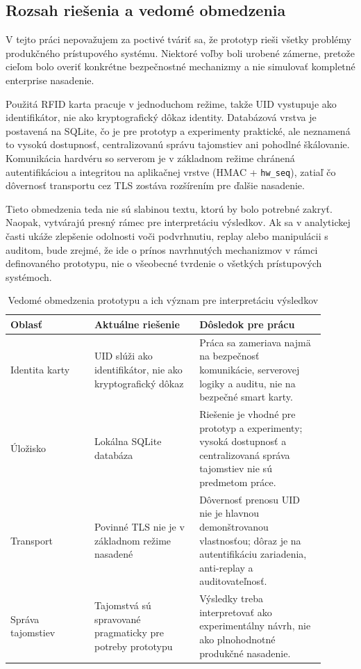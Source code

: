 \documentclass[journal,a4paper,onecolumn]{IEEEtran}
\begin{document}
\subsection{Rozsah riešenia a vedomé obmedzenia}

V tejto práci nepovažujem za poctivé tváriť sa, že prototyp rieši všetky problémy produkčného prístupového systému. Niektoré voľby boli urobené zámerne, pretože cieľom bolo overiť konkrétne bezpečnostné mechanizmy a nie simulovať kompletné enterprise nasadenie.

Použitá RFID karta pracuje v jednoduchom režime, takže UID vystupuje ako identifikátor, nie ako kryptografický dôkaz identity. Databázová vrstva je postavená na SQLite, čo je pre prototyp a experimenty praktické, ale neznamená to vysokú dostupnosť, centralizovanú správu tajomstiev ani pohodlné škálovanie. Komunikácia hardvéru so serverom je v základnom režime chránená autentifikáciou a integritou na aplikačnej vrstve (HMAC + \texttt{hw\_seq}), zatiaľ čo dôvernosť transportu cez TLS zostáva rozšírením pre ďalšie nasadenie.

Tieto obmedzenia teda nie sú slabinou textu, ktorú by bolo potrebné zakryť. Naopak, vytvárajú presný rámec pre interpretáciu výsledkov. Ak sa v analytickej časti ukáže zlepšenie odolnosti voči podvrhnutiu, replay alebo manipulácii s auditom, bude zrejmé, že ide o prínos navrhnutých mechanizmov v rámci definovaného prototypu, nie o všeobecné tvrdenie o všetkých prístupových systémoch.


\begin{table}[!ht]
\renewcommand{\arraystretch}{1.3}
\centering
\caption{Vedomé obmedzenia prototypu a ich význam pre interpretáciu výsledkov}
\label{tab:prototype_limits}
\small
\begin{tabular}{p{0.24\linewidth} p{0.30\linewidth} p{0.36\linewidth}}
\toprule
\textbf{Oblasť} & \textbf{Aktuálne riešenie} & \textbf{Dôsledok pre prácu} \\
\midrule
Identita karty & UID slúži ako identifikátor, nie ako kryptografický dôkaz & Práca sa zameriava najmä na bezpečnosť komunikácie, serverovej logiky a auditu, nie na bezpečné smart karty. \\
Úložisko & Lokálna SQLite databáza & Riešenie je vhodné pre prototyp a experimenty; vysoká dostupnosť a centralizovaná správa tajomstiev nie sú predmetom práce. \\
Transport & Povinné TLS nie je v základnom režime nasadené & Dôvernosť prenosu UID nie je hlavnou demonštrovanou vlastnosťou; dôraz je na autentifikáciu zariadenia, anti-replay a auditovateľnosť. \\
Správa tajomstiev & Tajomstvá sú spravované pragmaticky pre potreby prototypu & Výsledky treba interpretovať ako experimentálny návrh, nie ako plnohodnotné produkčné nasadenie. \\
\bottomrule
\end{tabular}
\normalsize
\end{table}
\end{document}
